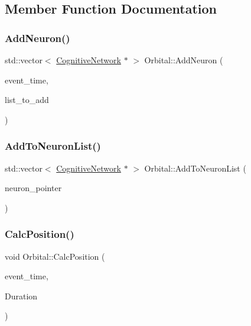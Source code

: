 \subsection{Member Function Documentation}
\mbox{\label{classOrbital_a57480cdd63dd1bf731864f513767800d}} 
\subsubsection{\texorpdfstring{Add\+Neuron()}{AddNeuron()}}
{\footnotesize\ttfamily std\+::vector$<$ \mbox{\hyperlink{classCognitiveNetwork}{Cognitive\+Network}} $\ast$ $>$ Orbital\+::\+Add\+Neuron (\begin{DoxyParamCaption}\item[{std\+::chrono\+::time\+\_\+point$<$ \mbox{\hyperlink{universe_8h_a0ef8d951d1ca5ab3cfaf7ab4c7a6fd80}{Clock}} $>$}]{event\+\_\+time,  }\item[{std\+::vector$<$ \mbox{\hyperlink{classCognitiveNetwork}{Cognitive\+Network}} $\ast$$>$}]{list\+\_\+to\+\_\+add }\end{DoxyParamCaption})}

\mbox{\label{classOrbital_a44230cebc40357d186c442bfac2507a4}} 
\subsubsection{\texorpdfstring{Add\+To\+Neuron\+List()}{AddToNeuronList()}}
{\footnotesize\ttfamily std\+::vector$<$ \mbox{\hyperlink{classCognitiveNetwork}{Cognitive\+Network}} $\ast$ $>$ Orbital\+::\+Add\+To\+Neuron\+List (\begin{DoxyParamCaption}\item[{\mbox{\hyperlink{classCognitiveNetwork}{Cognitive\+Network}} $\ast$}]{neuron\+\_\+pointer }\end{DoxyParamCaption})}

\mbox{\label{classOrbital_a5aa5edbae517ff393fc1eb0ae2422123}} 
\subsubsection{\texorpdfstring{Calc\+Position()}{CalcPosition()}}
{\footnotesize\ttfamily void Orbital\+::\+Calc\+Position (\begin{DoxyParamCaption}\item[{std\+::chrono\+::time\+\_\+point$<$ \mbox{\hyperlink{universe_8h_a0ef8d951d1ca5ab3cfaf7ab4c7a6fd80}{Clock}} $>$}]{event\+\_\+time,  }\item[{double}]{Duration }\end{DoxyParamCaption})}


